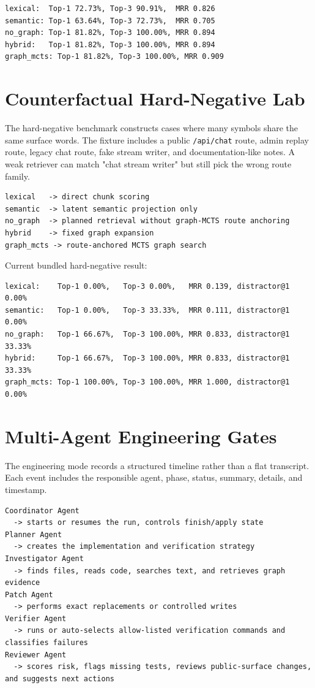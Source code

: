 \documentclass[UTF8,12pt,openany]{ctexbook}
\begin{document}
\begin{lstlisting}
lexical:  Top-1 72.73%, Top-3 90.91%,  MRR 0.826
semantic: Top-1 63.64%, Top-3 72.73%,  MRR 0.705
no_graph: Top-1 81.82%, Top-3 100.00%, MRR 0.894
hybrid:   Top-1 81.82%, Top-3 100.00%, MRR 0.894
graph_mcts: Top-1 81.82%, Top-3 100.00%, MRR 0.909
\end{lstlisting}

\section{Counterfactual Hard-Negative Lab}

The hard-negative benchmark constructs cases where many symbols share the same surface words. The fixture includes a public \texttt{/api/chat} route, admin replay route, legacy chat route, fake stream writer, and documentation-like notes. A weak retriever can match "chat stream writer" but still pick the wrong route family.\par

\begin{lstlisting}
lexical   -> direct chunk scoring
semantic  -> latent semantic projection only
no_graph  -> planned retrieval without graph-MCTS route anchoring
hybrid    -> fixed graph expansion
graph_mcts -> route-anchored MCTS graph search
\end{lstlisting}

Current bundled hard-negative result:\par

\begin{lstlisting}
lexical:    Top-1 0.00%,   Top-3 0.00%,   MRR 0.139, distractor@1 0.00%
semantic:   Top-1 0.00%,   Top-3 33.33%,  MRR 0.111, distractor@1 0.00%
no_graph:   Top-1 66.67%,  Top-3 100.00%, MRR 0.833, distractor@1 33.33%
hybrid:     Top-1 66.67%,  Top-3 100.00%, MRR 0.833, distractor@1 33.33%
graph_mcts: Top-1 100.00%, Top-3 100.00%, MRR 1.000, distractor@1 0.00%
\end{lstlisting}

\section{Multi-Agent Engineering Gates}

The engineering mode records a structured timeline rather than a flat transcript. Each event includes the responsible agent, phase, status, summary, details, and timestamp.\par

\begin{lstlisting}
Coordinator Agent
  -> starts or resumes the run, controls finish/apply state
Planner Agent
  -> creates the implementation and verification strategy
Investigator Agent
  -> finds files, reads code, searches text, and retrieves graph evidence
Patch Agent
  -> performs exact replacements or controlled writes
Verifier Agent
  -> runs or auto-selects allow-listed verification commands and classifies failures
Reviewer Agent
  -> scores risk, flags missing tests, reviews public-surface changes, and suggests next actions
\end{lstlisting}
\end{document}
